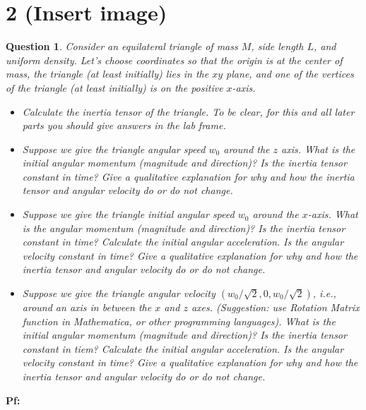\documentclass{article}
\newtheorem{question}{Question}
\begin{document}
\break

\section*{2 (Insert image)}
\begin{question}\label{q2}
    Consider an equilateral triangle of mass $M$, side length $L$, and uniform density. Let's choose coordinates so that the origin is at the center of mass, the triangle (at least initially) lies in the $xy$ plane, and one of the vertices of the triangle (at least initially) is on the positive $x$-axis.
    \begin{itemize}
        \item[(a)] Calculate the inertia tensor of the triangle. To be clear, for this and all later parts you should give answers in the lab frame.
        \item[(b)] Suppose we give the triangle angular speed $w_0$ around the $z$ axis. What is the initial angular momentum (magnitude and direction)? Is the inertia tensor constant in time? Give a qualitative explanation for why and how the inertia tensor and angular velocity do or do not change.
        \item[(c)] Suppose we give the triangle initial angular speed $w_0$ around the $x$-axis. What is the angular momentum (magnitude and direction)? Is the inertia tensor constant in time? Calculate the initial angular acceleration. Is the angular velocity constant in time? Give a qualitative explanation for why and how the inertia tensor and angular velocity do or do not change.
        \item[(d)] Suppose we give the triangle angular velocity $(w_0/\sqrt{2},0,w_0/\sqrt{2})$, i.e., around an axis in between the $x$ and $z$ axes. (Suggestion: use Rotation Matrix function in Mathematica, or other programming languages). What is the initial angular momentum (magnitude and direction)? Is the inertia tensor constant in tiem? Calculate the initial angular acceleration. Is the angular velocity constant in time? Give a qualitative explanation for why and how the inertia tensor and angular velocity do or do not change. 
    \end{itemize}
\end{question}

\textbf{Pf:}
\end{document}
